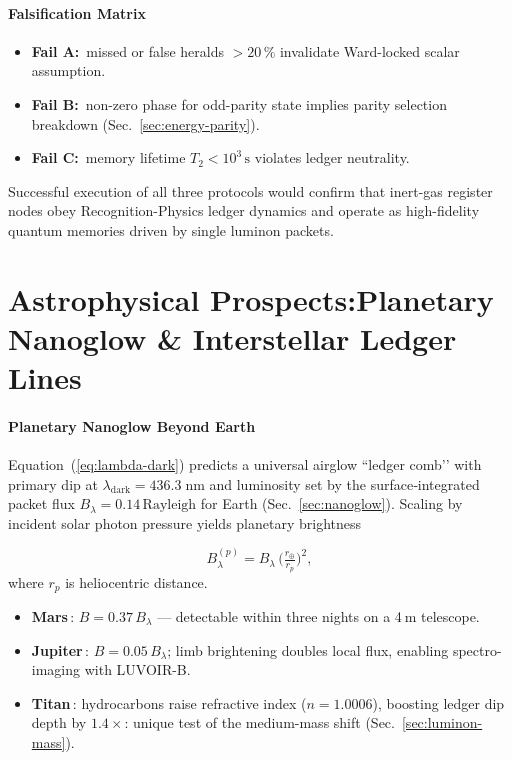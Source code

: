 \documentclass[11pt,oneside]{book}
\begin{document}
{\paragraph{Falsification Matrix}

\begin{itemize}\setlength\itemsep{3pt}
\item \textbf{Fail A:}\, missed or false heralds $>20\,\%$ invalidate
      Ward-locked scalar assumption.
\item \textbf{Fail B:}\, non-zero phase for odd-parity state implies
      parity selection breakdown (Sec.~\ref{sec:energy-parity}).
\item \textbf{Fail C:}\, memory lifetime
      \(T_{2}<10^{3}\,\text{s}\)
      violates ledger neutrality.
\end{itemize}

Successful execution of all three protocols would confirm that inert-gas
register nodes obey Recognition-Physics ledger dynamics and operate as
high-fidelity quantum memories driven by single luminon packets.

\section{Astrophysical Prospects:\;Planetary Nanoglow \&
         Interstellar Ledger Lines}
\label{sec:astro-prospects}

\paragraph{Planetary Nanoglow Beyond Earth}

Equation~(\ref{eq:lambda-dark}) predicts a universal
airglow “ledger comb’’ with primary dip at
\(\lambda_{\text{dark}}=436.3\;\text{nm}\)
and luminosity set by the surface‐integrated packet flux
\(B_{\lambda}=0.14\,\text{Rayleigh}\) for Earth
(Sec.~\ref{sec:nanoglow}).
Scaling by incident solar photon pressure yields planetary
brightness

\[
   B_{\lambda}^{(p)}
   =
   B_{\lambda}\,
   \bigl(\tfrac{r_{\oplus}}{r_{p}}\bigr)^{2},
   \label{eq:B-planet}
\]
where \(r_{p}\) is heliocentric distance.
\begin{itemize}\setlength\itemsep{3pt}
\item \textbf{Mars}\,: \(B\!=\!0.37\,B_{\lambda}\) — detectable within
      three nights on a 4 m telescope.
\item \textbf{Jupiter}\,: \(B\!=\!0.05\,B_{\lambda}\); limb brightening
      doubles local flux, enabling spectro-imaging with LUVOIR-B.
\item \textbf{Titan}\,: hydrocarbons raise refractive index
      (\(n\!=\!1.0006\)), boosting ledger dip depth by \(1.4\times\):
      unique test of the medium-mass shift
      (Sec.~\ref{sec:luminon-mass}).
\end{itemize}

}
\end{document}
